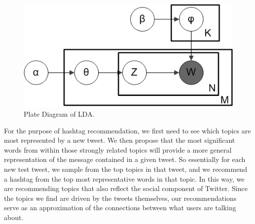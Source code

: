 \documentclass{acm_proc_article-sp}
\begin{document}
\begin{figure}[h]
	\includegraphics[scale=0.48]{figs/Smoothed_LDA}
	\caption{Plate Diagram of LDA.}
\end{figure}

\hspace*{5mm}For the purpose of hashtag recommendation, we first need to see which topics are most represented by a new tweet. We then propose that the most significant words from within those  strongly related topics will provide a more general representation of the message contained in a given tweet. So essentially for each new test tweet, we sample from the top topics in that tweet, and we recommend a hashtag from the top most representative words in that topic. In this way, we are recommending topics that also reflect the social component of Twitter. Since the topics we find are driven by the tweets themselves, our recommendations serve as an approximation of the connections between what users are talking about.\\
\end{document}
